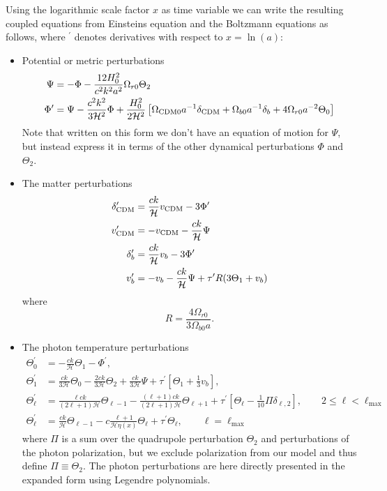 \documentclass[10pt,a4paper]{article}
\begin{document}
Using the logarithmic scale factor $x$ as time variable we can write the resulting coupled equations from Einsteins equation and the Boltzmann equations as follows, where $^\prime$ denotes derivatives with respect to $x = \ln(a)$:
\begin{itemize}
\item Potential or metric perturbations
\begin{align}
\Psi &= -\Phi - \frac{12H_0^2}{c^2k^2a^2}\Omega_{r0}\Theta_2 \label{eq:Psi}
\\
\Phi^\prime &= \Psi - \frac{c^2k^2}{3\mathcal{H}^2} \Phi + \frac{H_0^2}{2\mathcal{H}^2}
\left[\Omega_{\rm CDM 0} a^{-1} \delta_{\rm CDM} + \Omega_{b0} a^{-1} \delta_b + 4\Omega_{r0}
a^{-2}\Theta_0\right]
\end{align}%
Note that written on this form we don't have an equation of motion for $\Psi$, but instead express it in terms of the other dynamical perturbations $\Phi$ and $\Theta_2$.

\item The matter perturbations
\begin{align}
\delta_{\rm CDM}^\prime &= \frac{ck}{\mathcal{H}} v_{\rm CDM} - 3\Phi^\prime \\
v_{\rm CDM}^\prime &= -v_{\rm CDM} -\frac{ck}{\mathcal{H}} \Psi \\
\delta_b^\prime &= \frac{ck}{\mathcal{H}}v_b -3\Phi^\prime \\
v_b^\prime &= -v_b - \frac{ck}{\mathcal{H}}\Psi + \tau^\prime R(3\Theta_1 + v_b)
\end{align}
where
\begin{equation}
R = \frac{4\Omega_{r0}}{3\Omega_{b0}a}.
\label{eq:R}
\end{equation}

\item The photon temperature perturbations
\begin{align}
\Theta^\prime_0 &= -\frac{ck}{\mathcal{H}} \Theta_1 - \Phi^\prime,
\\
\Theta^\prime_1 &=  \frac{ck}{3\mathcal{H}} \Theta_0 - \frac{2ck}{3\mathcal{H}}\Theta_2 +
\frac{ck}{3\mathcal{H}}\Psi + \tau^\prime\left[\Theta_1 + \frac{1}{3}v_b\right],
\label{eq:dipole ODE}
\\
\Theta^\prime_\ell &= \frac{\ell ck}{(2\ell+1)\mathcal{H}}\Theta_{\ell-1} - \frac{(\ell+1)ck}{(2\ell+1)\mathcal{H}}
\Theta_{\ell+1} + \tau^\prime\left[\Theta_\ell - \frac{1}{10}\Pi
\delta_{\ell,2}\right], \quad\quad 2 \leq \ell < \ell_{\textrm{max}}
\\
\Theta_{\ell}^\prime &= \frac{ck}{\mathcal{H}}
\Theta_{\ell-1}-c\frac{\ell+1}{\mathcal{H}\eta(x)}\Theta_\ell+\tau^\prime\Theta_\ell,
\quad\quad \ell = \ell_{\textrm{max}}
\end{align}
where $\Pi$ is a sum over the quadrupole perturbation $\Theta_2$ and perturbations of the photon polarization, but we exclude polarization from our model and thus define $\Pi \equiv \Theta_2$. The photon perturbations are here directly presented in the expanded form using Legendre polynomials.


\end{itemize}
\end{document}
